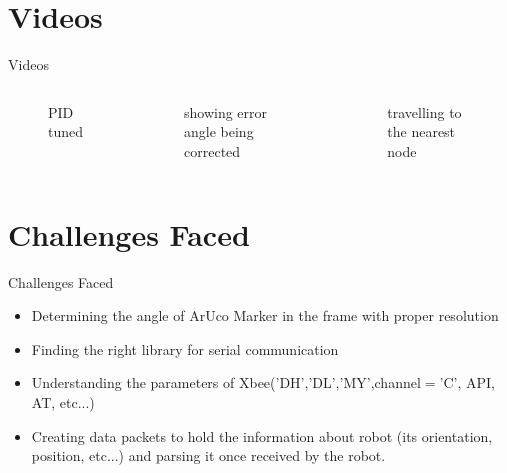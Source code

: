 \documentclass[10pt,a4paper]{beamer}
\begin{document}
\section{Videos}
\begin{frame}{Videos}
\begin{columns}
\begin{figure}

\vspace{-1 em}\caption{\small{PID tuned}}
\end{figure}\vspace{-2 em}
\begin{figure}
\vspace{-1 em}\caption{\small{showing error angle being corrected}}
\end{figure}
\begin{figure}

\caption{travelling to the nearest node}
\end{figure}

\end{columns}

\end{frame}

\section{Challenges Faced}
\begin{frame}{Challenges Faced}
	\begin{itemize}
		\item Determining the angle of ArUco Marker in the frame with proper resolution\pause
		\item Finding the right library for serial communication\pause
		\item Understanding the parameters of Xbee('DH','DL','MY',channel$=$'C', API, AT, etc...)\pause
		\item Creating data packets to hold the information about robot (its orientation, position, etc...) and parsing it once received by the robot.
	\end{itemize}
\end{frame}
\end{document}
